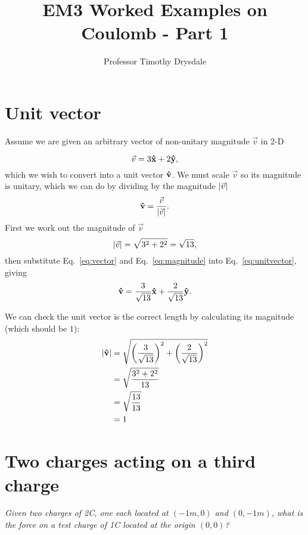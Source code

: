 \documentclass{tufte-handout}
\title{EM3 Worked Examples on Coulomb - Part 1}
\author{Professor Timothy Drysdale}
\newcommand{\uvec}[1]{{\bm{\hat{\textnormal{\bfseries #1}}}}}
\newcommand{\ux}{\uvec{x}}
\newcommand{\uy}{\uvec{y}}
\newcommand{\uv}{\uvec{v}}
\newcommand{\vv}{\vec{v}}
\DeclarePairedDelimiter\abs{\lvert}{\rvert}%
\begin{document}
\maketitle

\section{Unit vector}

Assume we are given an arbitrary  vector of non-unitary magnitude $\vec{v}$ in 2-D 
\begin{marginfigure}

\end{marginfigure}
\begin{equation}
\label{eq:vector}
\vv = 3\ux + 2\uy, 
\end{equation}
which we wish to convert into a unit vector $\uv$. We must scale $\vv$ so its magnitude is unitary, which we can do by dividing by the magnitude $\abs{\vv}$
\begin{equation}
\label{eq:unitvector}
\uv = \frac{\vv}{\abs{\vv}}. 
\end{equation}
First we work out the magnitude of $\vv$
\begin{equation}
\label{eq:magnitude}
\abs{\vv} = \sqrt{3^2 + 2^2} = \sqrt{13},
\end{equation}
then substitute Eq.~\ref{eq:vector} and Eq.~\ref{eq:magnitude} into Eq.~\ref{eq:unitvector}, giving
\begin{equation}
\uv = \frac{3}{\sqrt{13}}\ux + \frac{2}{\sqrt{13}}\uy. 
\end{equation}

We can check the unit vector is the correct length by calculating its magnitude (which should be $1$):
\begin{align}
\abs{\uv} & = \sqrt{\left(\frac{3}{\sqrt{13}}\right)^2 + \left(\frac{2}{\sqrt{13}}\right)^2} \\
& =  \sqrt{\frac{3^2 + 2^2}{13}} \\
& = \sqrt{\frac{13}{13}} \\
& = 1
\end{align}

\section{Two charges acting on a third charge}

\emph{Given two charges of 2C, one each located at $(-1m,0)$ and $(0,-1m)$, what is the force on a test charge of 1C located at the origin $(0,0)$?}
\begin{marginfigure}

\end{marginfigure}
\vspace{0.5cm}
\end{document}
